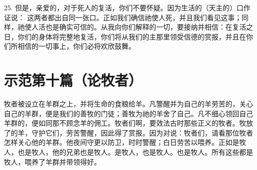 25. 但是，亲爱的，对于死人的复活，你们不要怀疑。因为生活的（天主的）口作证说： 这两者都出自同一张口。正如我们确信祂使人死，并且我们看见这事；同样，祂使人活也是确实可信的。从我向你们解释的一切，要接纳并相信：在复活之日，你们的身体将完整地复活，你们将从我们的主那里领受信德的赏报，并且在你们所相信的一切事上，你们必将欢欣鼓舞。\par



\section{示范第十篇（论牧者）}

牧者被设立在羊群之上，并将生命的食粮给羊。凡警醒并为自己的羊劳苦的，关心自己的羊群，便是我们的善牧的门徒；善牧为祂的羊舍了自己。凡不细心领回自己羊群的，便如同那不顾念羊的佣工。牧者们啊，要效法古时那些正义的牧者。牧放了的羊，守护它们，劳苦警醒，因此得了赏报。因为对说：牧者们，请看那位牧者怎样关心他的羊群。他夜间守更以防卫，时时警醒；白日劳苦以喂养。正如是牧人，也是牧人，他的兄弟也是牧人。是牧人，也是牧人。也是牧人。所有这些都是牧人，喂养了羊群并带领得好。\par

